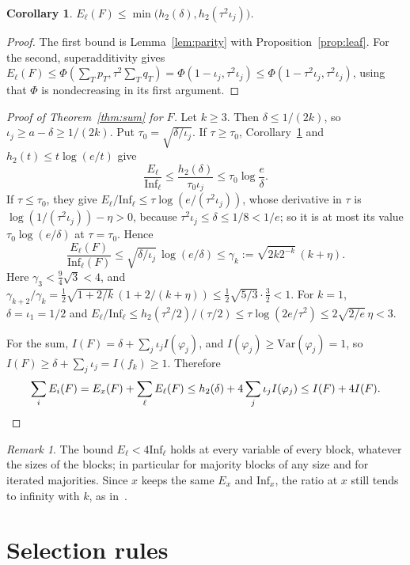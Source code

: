 \documentclass[11pt]{amsart}
\newtheorem{corollary}[theorem]{Corollary}
\theoremstyle{remark}
\newtheorem{remark}[theorem]{Remark}
\newcommand{\Inf}{\mathrm{Inf}}
\newcommand{\Var}{\mathrm{Var}}
\begin{document}
\begin{corollary}\label{cor:leaf}
$E_\ell(F)\le\min\bigl(h_2(\delta),h_2(\tau^2\iota_j)\bigr)$.
\end{corollary}

\begin{proof}
The first bound is Lemma~\ref{lem:parity} with Proposition~\ref{prop:leaf}. For the second, superadditivity gives
$E_\ell(F)\le\Phi(\sum_Tp_T,\tau^2\sum_Tq_T)=\Phi(1-\iota_j,\tau^2\iota_j)\le\Phi(1-\tau^2\iota_j,\tau^2\iota_j)$, using
that $\Phi$ is nondecreasing in its first argument.
\end{proof}

\begin{proof}[Proof of Theorem~\ref{thm:sum} for $F$]
Let $k\ge3$. Then $\delta\le1/(2k)$, so $\iota_j\ge a-\delta\ge1/(2k)$. Put $\tau_0=\sqrt{\delta/\iota_j}$. If $\tau\ge\tau_0$,
Corollary~\ref{cor:leaf} and $h_2(t)\le t\log(e/t)$ give
\[
\frac{E_\ell}{\Inf_\ell}\le\frac{h_2(\delta)}{\tau_0\iota_j}\le \tau_0\log\frac e\delta.
\]
If $\tau\le\tau_0$, they give $E_\ell/\Inf_\ell\le\tau\log(e/(\tau^2\iota_j))$, whose derivative in $\tau$ is
$\log(1/(\tau^2\iota_j))-\eta>0$, because $\tau^2\iota_j\le\delta\le1/8<1/e$; so it is at most its value $\tau_0\log(e/\delta)$ at $\tau=\tau_0$. Hence
\[
\frac{E_\ell(F)}{\Inf_\ell(F)}\le\sqrt{\delta/\iota_j}\,\log(e/\delta)\le \gamma_k:=\sqrt{2k2^{-k}}\,(k+\eta).
\]
Here $\gamma_3<\frac94\sqrt3<4$, and $\gamma_{k+2}/\gamma_k=\frac12\sqrt{1+2/k}\,(1+2/(k+\eta))\le\frac12\sqrt{5/3}\cdot\frac32<1$. For
$k=1$, $\delta=\iota_1=1/2$ and $E_\ell/\Inf_\ell\le h_2(\tau^2/2)/(\tau/2)\le\tau\log(2e/\tau^2)\le2\sqrt{2/e}\,\eta<3$.

For the sum, $I(F)=\delta+\sum_j\iota_jI(\varphi_j)$, and $I(\varphi_j)\ge\Var(\varphi_j)=1$, so
$I(F)\ge\delta+\sum_j\iota_j=I(f_k)\ge1$. Therefore
\[
\sum_iE_i(F)=E_x(F)+\sum_\ell E_\ell(F)\le h_2(\delta)+4\sum_j\iota_jI(\varphi_j)\le I(F)+4I(F).\qedhere
\]
\end{proof}

\begin{remark}
The bound $E_\ell<4\Inf_\ell$ holds at every variable of every block, whatever the sizes of the blocks; in particular
for majority blocks of any size and for iterated majorities. Since $x$ keeps the same $E_x$ and $\Inf_x$, the ratio at
$x$ still tends to infinity with $k$, as in~\cite[Proposition~5.1]{Shm3}.
\end{remark}

\section{Selection rules}\label{sec:rules}
\end{document}
